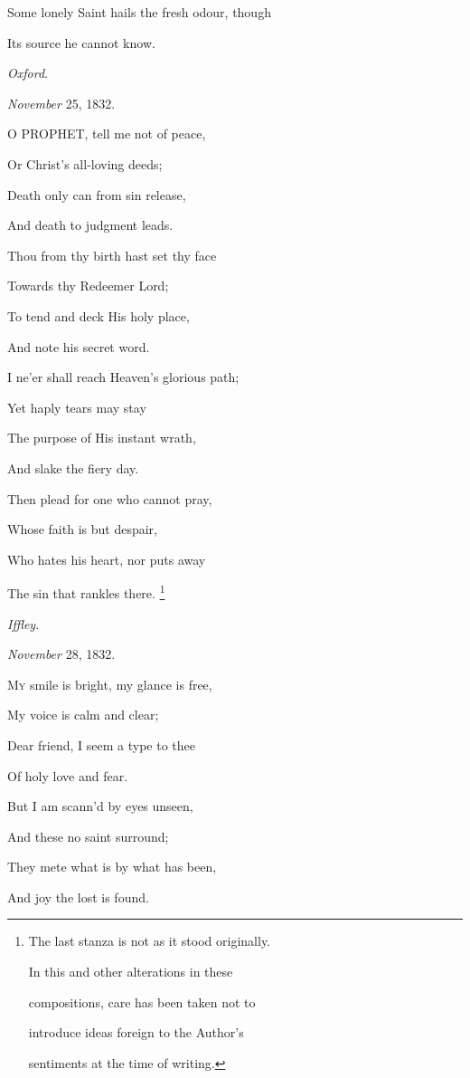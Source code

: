 Some lonely Saint hails the fresh odour, though

Its source he cannot know.

\emph{Oxford}.

\emph{November} 25, 1832.


O PROPHET, tell me not of peace,

Or Christ's all-loving deeds;

Death only can from sin release,

And death to judgment leads.

Thou from thy birth hast set thy face

Towards thy Redeemer Lord;

To tend and deck His holy place,

And note his secret word.

I ne'er shall reach Heaven's glorious path;

Yet haply tears may stay

The purpose of His instant wrath,

And slake the fiery day. 

Then plead for one who cannot pray,

Whose faith is but despair,

Who hates his heart, nor puts away

The sin that rankles there. \footnote{The last stanza is not as it stood originally.

In this and other alterations in these

compositions, care has been taken not to

introduce ideas foreign to the Author's

sentiments at the time of writing.}

\emph{Iffley}.

\emph{November} 28, 1832.


M\textsc{y} smile is bright, my glance is free,

My voice is calm and clear;

Dear friend, I seem a type to thee

Of holy love and fear.

But I am scann'd by eyes unseen,

And these no saint surround;

They mete what is by what has been,

And joy the lost is found.

